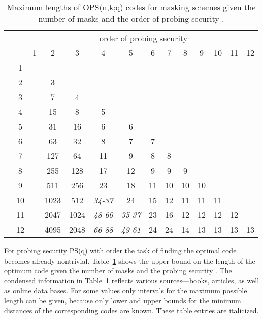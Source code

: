 \documentclass[11pt]{llncs}
\begin{document}
\begin{table}[h!t]
\centering
\begin{tabular*}{\textwidth}{@{\extracolsep{\fill}}|@{\quad}cc|cccccccccccc@{\quad}|}
\hline
    &    & \multicolumn{12}{c|}{order of probing security } \\
    &    &     1    &    2  &      3 &       4  &      5   &      6 &     7  &     8  &     9  &     10 &     11  &    12 \\
\hline
    & 1  &   &       &        &          &          &        &        &        &        &        &         &       \\
    & 2  &   &    3  &        &          &          &        &        &        &        &        &         &       \\
    & 3  &   &    7  &     4  &          &          &        &        &        &        &        &         &       \\
    & 4  &   &   15  &     8  &      5   &          &        &        &        &        &        &         &       \\
    & 5  &   &   31  &    16  &      6   &     6    &        &        &        &        &        &         &       \\
 & 6  &   &   63  &    32  &      8   &     7    &     7  &        &        &        &        &         &       \\
    & 7  &   &  127  &    64  &     11   &     9    &     8  &     8  &        &        &        &         &       \\
    & 8  &   &  255  &   128  &     17   &    12    &     9  &     9  &     9  &        &        &         &       \\
    & 9  &   &  511  &   256  &     23   &    18    &    11  &    10  &    10  &    10  &        &         &       \\
    & 10 &   & 1023  &   512  &\em{34-37}&    24    &    15  &    12  &    11  &    11  &    11  &         &       \\
    & 11 &   & 2047  &  1024  &\em{48-60}&\em{35-37}&    23  &    16  &    12  &    12  &    12  &    12   &       \\
    & 12 &   & 4095  &  2048  &\em{66-88}&\em{49-61}&    24  &    24  &    14  &    13  &    13  &    13   &   13  \\
\hline
\end{tabular*}
\medskip
\caption{Maximum lengths  of OPS(n,k;q) codes for masking schemes
         given the number of masks  and the order of probing security .}
\label{Tab:MaskNo}
\end{table}
For probing security PS(q) with order 
the task of finding the optimal code becomes already nontrivial.
Table~\ref{Tab:MaskNo} shows the upper bound on the length  of the
optimum code given the number of masks 
and the probing security .
The condensed information in Table~\ref{Tab:MaskNo} reflects various
sources---books, articles, as well as online data bases.
For some values only intervals for the
maximum possible length can be given,
because only lower and upper bounds for the minimum
distances of the corresponding codes are known.
These table entries are italicized.
\end{document}
